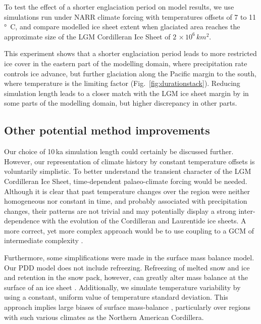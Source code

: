 To test the effect of a shorter englaciation period on model results, we use simulations run under NARR climate forcing with temperatures offsets of 7 to 11\,\unit{\degree C}, and compare modelled ice sheet extent when glaciated area reaches the approximate size of the LGM Cordilleran Ice Sheet of $2\,\times10^6\,\unit{km^2}$.

This experiment shows that a shorter englaciation period leads to more restricted ice cover in the eastern part of the modelling domain, where precipitation rate controls ice advance, but further glaciation along the Pacific margin to the south, where temperature is the limiting factor (Fig.~\ref{fig:durationstack}). Reducing simulation length leads to a closer match with the LGM ice sheet margin by \citet{dyke-2004} in some parts of the modelling domain, but higher discrepancy in other parts.

\subsection{Other potential method improvements}

Our choice of 10\,ka simulation length could certainly be discussed further. However, our representation of climate history by constant temperature offsets is voluntarily simplistic. To better understand the transient character of the LGM Cordilleran Ice Sheet, time-dependent palaeo-climate forcing would be needed. Although it is clear that past temperature changes over the region were neither homogeneous nor constant in time, and probably associated with precipitation changes, their patterns are not trivial and may potentially display a strong inter-dependence with the evolution of the Cordilleran and Laurentide ice sheets. A more correct, yet more complex approach would be to use coupling to a GCM of intermediate complexity \citep{yoshimori-etal-2001,calov-etal-2002,abeouchi-etal-2007,charbit-etal-2013}.

Furthermore, some simplifications were made in the surface mass balance model. Our PDD model does not include refreezing. Refreezing of melted snow and ice and retention in the snow pack, however, can greatly alter mass balance at the surface of an ice sheet \citep{janssens-huybrechts-2000}. Additionally, we simulate temperature variability by using a constant, uniform value of temperature standard deviation. This approach implies large biases of surface mass-balance \citep{charbit-etal-2013,rau-rogozhina-2013,seguinot-inpress}, particularly over regions with such various climates as the Northern American Cordillera.
